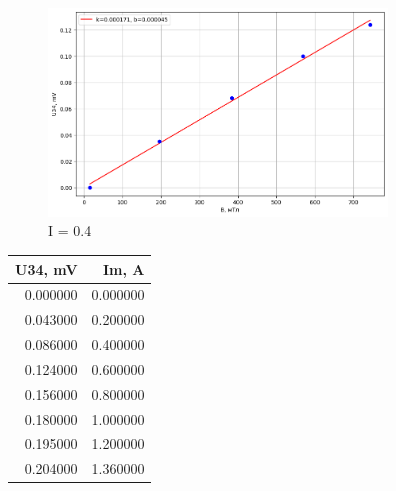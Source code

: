 \documentclass[a4paper, 12pt]{article}
\begin{document}
        \begin{figure}[h!]
            \centering
            \includegraphics[width=90mm]{./images/image copy.png}
            \caption{I = 0.4}
        \end{figure}
        \newpage
        \begin{table}[h!]
            \centering
        \begin{tabular}{rr}
            \toprule
            U34, mV & Im, A \\
            \midrule
            0.000000 & 0.000000 \\
            0.043000 & 0.200000 \\
            0.086000 & 0.400000 \\
            0.124000 & 0.600000 \\
            0.156000 & 0.800000 \\
            0.180000 & 1.000000 \\
            0.195000 & 1.200000 \\
            0.204000 & 1.360000 \\
            \bottomrule
            \end{tabular}
        \end{table}
\end{document}
